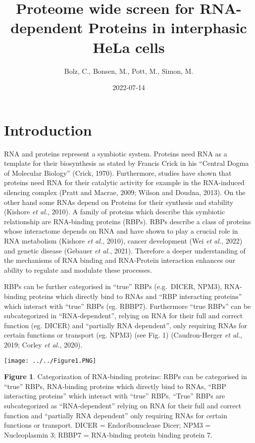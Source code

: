 \documentclass[
]{article}
\title{Proteome wide screen for RNA-dependent Proteins in interphasic
HeLa cells}
\author{Bolz, C., Bonsen, M., Pott, M., Simon, M.}
\date{2022-07-14}
\begin{document}
\maketitle

\hypertarget{introduction}{%
\section{Introduction}\label{introduction}}

RNA and proteins represent a symbiotic system. Proteins need RNA as a
template for their biosynthesis as stated by Francis Crick in his
``Central Dogma of Molecular Biology'' (Crick, 1970). Furthermore,
studies have shown that proteins need RNA for their catalytic activity
for example in the RNA-induced silencing complex (Pratt and Macrae,
2009; Wilson and Doudna, 2013). On the other hand some RNAs depend on
Proteins for their synthesis and stability (Kishore \emph{et al.},
2010). A family of proteins which describe this symbiotic relationship
are RNA-binding proteins (RBPs). RBPs describe a class of proteins whose
interactome depends on RNA and have shown to play a crucial role in RNA
metabolism (Kishore \emph{et al.}, 2010), cancer development (Wei
\emph{et al.}, 2022) and genetic disease (Gebauer \emph{et al.}, 2021).
Therefore a deeper understanding of the mechanisms of RNA binding and
RNA-Protein interaction enhances our ability to regulate and modulate
these processes.

RBPs can be further categorised in ``true'' RBPs (e.g.~DICER, NPM3),
RNA-binding proteins which directly bind to RNAs and ``RBP interacting
proteins'' which interact with ``true'' RBPs (eg. RBBP7). Furthermore
``true RBPs'' can be subcategorized in ``RNA-dependent'', relying on RNA
for their full and correct function (eg. DICER) and ``partially RNA
dependent'', only requiring RNAs for certain functions or transport (eg.
NPM3) (see Fig. 1) (Caudron-Herger \emph{et al.}, 2019; Corley \emph{et
al.}, 2020).

\texttt{[image: ../../Figure1.PNG]}

\textbf{Figure 1}. Categorization of RNA-binding proteins: RBPs can be
categorised in ``true'' RBPs, RNA-binding proteins which directly bind
to RNAs, ``RBP interacting proteins'' which interact with ``true'' RBPs.
``True'' RBPs are subcategorized as ``RNA-dependent'' relying on RNA for
their full and correct function and ``partially RNA dependent'' only
requiring RNAs for certain functions or transport. DICER =
Endoribonuclease Dicer; NPM3 = Nucleoplasmin 3; RBBP7 = RNA-binding
protein binding protein 7.
\end{document}
